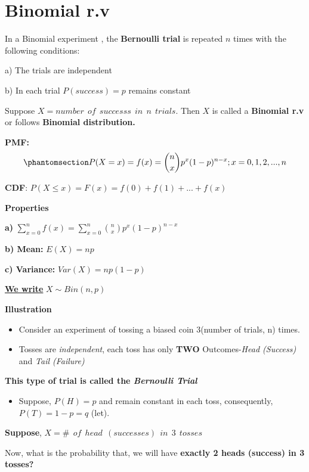 \documentclass[
  11pt,
  letterpaper,
  DIV=11,
  numbers=noendperiod]{scrreprt}
\providecommand{\tightlist}{%
  \setlength{\itemsep}{0pt}\setlength{\parskip}{0pt}}
\begin{document}
\section{Binomial r.v}\label{binomial-r.v}

In a Binomial experiment , the \textbf{Bernoulli trial} is repeated
\(n\) times with the following conditions:

a) The trials are independent

b) In each trial \(P(success)=p\) remains constant

Suppose \(X=number \ \ of \ \ successs \ \ in \ \ n\ \ trials\). Then
\(X\) is called a \textbf{Binomial r.v} or follows \textbf{Binomial
distribution.}

\textbf{PMF:}
\begin{equation}\phantomsection\label{eq-binomial}{P(X=x)=f(x)=\binom {n}{x} p^x (1-p)^{n-x} ; x=0,1,2,...,n}\end{equation}

\textbf{CDF}: \(P(X\le x)=F(x)=f(0)+f(1)+...+f(x)\)

\textbf{Properties}

\textbf{a)}
\(\sum_{x=0}^n f(x)=\sum_{x=0}^n \binom {n}{x} p^x (1-p)^{n-x}\)

\textbf{b) Mean:} \(E(X)=np\)

\textbf{c) Variance:} \(Var(X)=np(1-p)\)

\ul{\textbf{We write}} \(X\sim Bin (n,p)\)

\textbf{Illustration}

\begin{itemize}
\tightlist
\item
  Consider an experiment of tossing a biased coin 3(number of trials, n)
  times.
\item
  Tosses are \emph{independent}, each toss has only \textbf{TWO}
  Outcomes-\emph{Head (Success)} and \emph{Tail (Failure)}
\end{itemize}

\textbf{This type of trial is called the \emph{Bernoulli Trial}}

\begin{itemize}
\tightlist
\item
  Suppose, \(P(H)=p\) and remain constant in each toss, consequently,
  \(P(T)=1-p=q\) (let).
\end{itemize}

\textbf{Suppose},
\(X=\# \ \ of\ \ head\ \ (successes)\ \  in\ \ 3\ \ tosses\)

Now, what is the probability that, we will have \textbf{exactly 2 heads
(success) in 3 tosses?}
\end{document}
